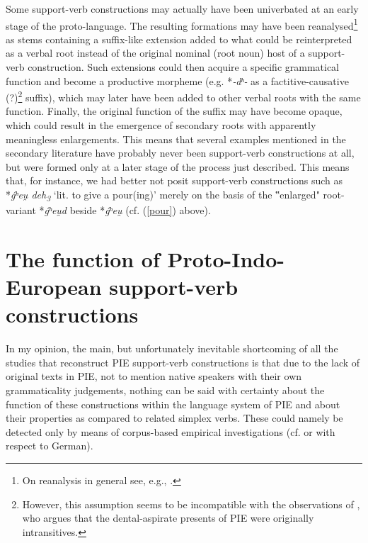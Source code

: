 \documentclass[output=paper,colorlinks,citecolor=brown]{langscibook}
\begin{document}
Some support-verb constructions may actually have been univerbated at an early stage of the proto-language. The resulting formations may have been reanalysed\footnote{On reanalysis in general see, e.g., \citet[50--68]{HopperTraugott2003}.}  as stems containing a suffix-like extension added to what could be reinterpreted as a verbal root instead of the original nominal (root noun) host of a support-verb construction. Such extensions could then acquire a specific grammatical function and become a productive morpheme (e.g. *\textit{‑dʰ‑} as a factitive-causative (?)\footnote{However, this assumption seems to be incompatible with the observations of \citet[3 n. 3 and passim]{RothsteinDowden2022}, who argues that the dental-aspirate presents of PIE were originally intransitives.}            suffix), which may later have been added to other verbal roots with the same function. Finally, the original function of the suffix may have become opaque, which could result in the emergence of secondary roots with apparently meaningless enlargements. This means that several examples mentioned in the secondary literature have probably never been support-verb constructions at all, but were formed only at a later stage of the process just described. This means that, for instance, we had better not posit support-verb constructions such as *\textit{ǵʰeu̯ deh\textsubscript{3}} ‘lit. to give a pour(ing)’ merely on the basis of the ‟enlarged" root-variant *\textit{ǵʰeu̯d} beside *\textit{ǵʰeu̯} (cf. (\ref{pour}) above).

\section{The function of Proto-Indo-European support-verb constructions}

In my opinion, the main, but unfortunately inevitable shortcoming of all the studies that reconstruct PIE support-verb constructions is that due to the lack of original texts in PIE, not to mention native speakers with their own grammaticality judgements, nothing can be said with certainty about the function of these constructions within the language system of PIE and about their properties as compared to related simplex verbs. These could namely be detected only by means of corpus-based empirical investigations (cf. \citealt{Storrer2006} or \citealt{Kamber2008} with respect to German). 
\end{document}
